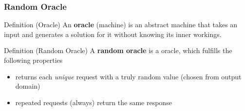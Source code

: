 \begin{frame}
	\frametitle{Random Oracle}

	\begin{block}{Definition (Oracle)}
		An \textbf{oracle} (machine) is an abstract machine that takes an input and generates a solution for it without knowing its inner workings.
	\end{block}
	\begin{block}{Definition (Random Oracle)}
		A \textbf{random oracle} is a oracle, which fulfills the following properties
		\begin{itemize}
			\item returns each \textit{unique} request with a truly random value (chosen from output domain)
			\item repeated requests (always) return the same response
		\end{itemize}
	\end{block}
\end{frame}